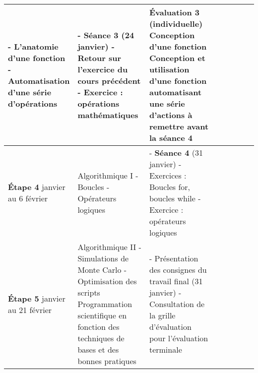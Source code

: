 \documentclass[12]{article}
\begin{document}
\begin{center}
\begin{tabular}{| p{0.1\linewidth} | p{0.3\linewidth} | p{0.3\linewidth} | p{0.3\linewidth} | }
            - L'anatomie d'une fonction\hfill\hfill \linebreak
            - Automatisation d'une série d'opérations\hfill &
        - \textbf{Séance 3} (24 janvier)\hfill\hfill \linebreak 
        - Retour sur l'exercice du cours précédent\hfill\hfill \linebreak
        - Exercice : opérations mathématiques\hfill\hfill & 
        \textbf{Évaluation 3} (individuelle) \linebreak
        \textbf{Conception d'une fonction}\hfill\hfill \linebreak
    Conception et utilisation d'une fonction automatisant une série d'actions à remettre avant la séance 4\hfill\hfill \\
        \hline
        \textbf{Étape 4} \linebreak 31 janvier au 6 février & 
        Algorithmique I\hfill\hfill \linebreak\linebreak 
            - Boucles\hfill\hfill \linebreak
            - Opérateurs logiques\hfill\hfill &
        - \textbf{Séance 4} (31 janvier)\hfill\hfill \linebreak
        - Exercices : Boucles for, boucles while\hfill\hfill \linebreak
        - Exercice : opérateurs logiques\hfill\hfill & 
        \\
        \hline
        \textbf{Étape 5} \linebreak 31 janvier au 21 février & 
        Algorithmique II\hfill\hfill \linebreak\linebreak 
            - Simulations de Monte Carlo\hfill\hfill \linebreak
            - Optimisation des scripts\hfill\hfill \linebreak\linebreak
        Programmation scientifique en fonction des techniques de bases et des bonnes pratiques &
        - Présentation des consignes du travail final (31 janvier)\hfill\hfill \linebreak
        - Consultation de la grille d'évaluation pour l'évaluation terminale\hfill\hfill \linebreak

\end{tabular}
\end{center}
\end{document}
